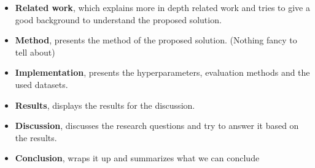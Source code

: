  \begin{itemize}
    \item \textbf{Related work}, which explains more in depth related work and tries to give a good background to understand the proposed solution.
    \item \textbf{Method}, presents the method of the proposed solution. (Nothing fancy to tell about)
    \item \textbf{Implementation}, presents the hyperparameters, evaluation methods and the used datasets.
    \item \textbf{Results}, displays the results for the discussion.
    \item \textbf{Discussion}, discusses the research questions and try to answer it based on the results.
    \item \textbf{Conclusion}, wraps it up and summarizes what we can conclude
 \end{itemize}
